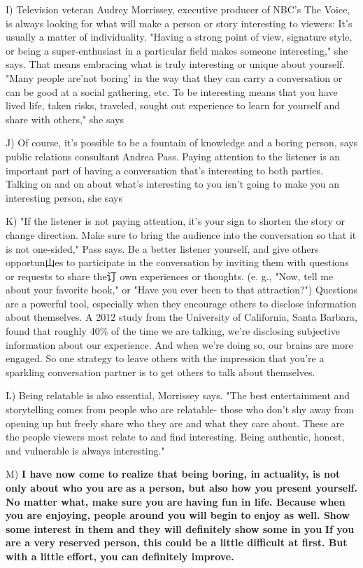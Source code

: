 \documentclass[UTF8,11pt]{ctexart}
\begin{document}
I) Television veteran Audrey Morrissey, executive producer of NBC's The Voice, is always looking for what will make a person or story interesting to viewers: It's usually a matter of individuality. "Having a strong point of view, signature style, or being a super-enthusiast in a particular field makes someone interesting," she says. That means embracing what is truly interesting or unique about yourself. "Many people are'not boring' in the way that they can carry a conversation or can be good at a social gathering, etc. To be interesting means that you have lived life, taken risks, traveled, sought out experience to learn for yourself and share with others," she says


J) Of course, it's possible to be a fountain of knowledge and a boring person, says public relations consultant Andrea Pass. Paying attention to the listener is an important part of having a conversation that's interesting to both parties. Talking on and on about what's interesting to you isn't going to make you an interesting person, she says


K) "If the listener is not paying attention, it's your sign to shorten the story or change direction. Make sure to bring the audience into the conversation so that it is not one-sided," Pass says. Be a better listener yourself, and give others opportun山es to participate in the conversation by inviting them with questions or requests to share the订 own experiences or thoughts. (e. g., "Now, tell me about your favorite book," or "Have you ever been to that attraction?") Questions are a powerful tool, especially when they encourage others to disclose information about themselves. A 2012 study from the University of California, Santa Barbara, found that roughly 40\% of the time we are talking, we're disclosing subjective information about our experience. And when we're doing so, our brains are more engaged. So one strategy to leave others with the impression that you're a sparkling conversation partner is to get others to talk about themselves.


L) Being relatable is also essential, Morrissey says. "The best entertainment and storytelling comes from people who are relatable- those who don't shy away from opening up but freely share who they are and what they care about. These are the people viewers most relate to and find interesting. Being authentic, honest, and vulnerable is always interesting."


M) \textbf{I have now come to realize that being boring, in actuality, is not only about who you are} \textbf{as a person, but also how you present yourself. No matter what, make sure you are} \textbf{having fun in life. Because when you are enjoying, people around you will begin to} \textbf{enjoy as well. Show some interest in them and they will definitely show some in you} \textbf{If you are a very reserved person, this could be a little difficult at first. But with a little} \textbf{effort, you can definitely improve.}
\end{document}
